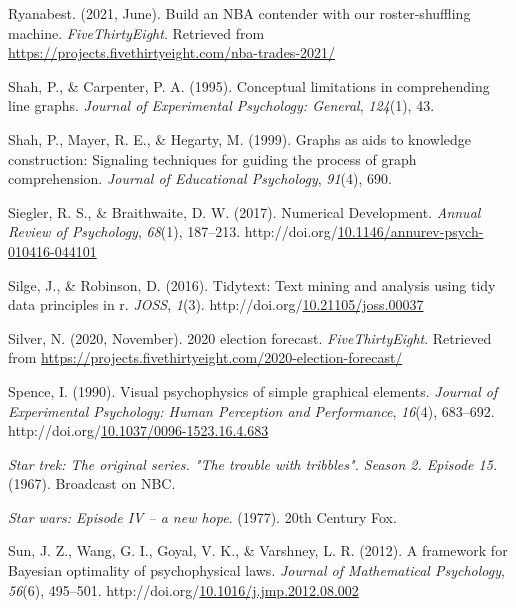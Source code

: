 \documentclass[print]{nuthesis}
\newlength{\cslhangindent}
\newenvironment{CSLReferences}%
{\setlength{\parindent}{0pt}%
\everypar{\setlength{\hangindent}{\cslhangindent}}\ignorespaces}%
{\par}
\begin{document}
\begin{CSLReferences}{1}{0}
\leavevmode{}%
Ryanabest. (2021, June). Build an NBA contender with our roster-shuffling machine. \emph{FiveThirtyEight}. Retrieved from \url{https://projects.fivethirtyeight.com/nba-trades-2021/}

\leavevmode{}%
Shah, P., \& Carpenter, P. A. (1995). Conceptual limitations in comprehending line graphs. \emph{Journal of Experimental Psychology: General}, \emph{124}(1), 43.

\leavevmode{}%
Shah, P., Mayer, R. E., \& Hegarty, M. (1999). Graphs as aids to knowledge construction: Signaling techniques for guiding the process of graph comprehension. \emph{Journal of Educational Psychology}, \emph{91}(4), 690.

\leavevmode{}%
Siegler, R. S., \& Braithwaite, D. W. (2017). Numerical {Development}. \emph{Annual Review of Psychology}, \emph{68}(1), 187--213. http://doi.org/\href{https://doi.org/10.1146/annurev-psych-010416-044101}{10.1146/annurev-psych-010416-044101}

\leavevmode{}%
Silge, J., \& Robinson, D. (2016). Tidytext: Text mining and analysis using tidy data principles in r. \emph{JOSS}, \emph{1}(3). http://doi.org/\href{https://doi.org/10.21105/joss.00037}{10.21105/joss.00037}

\leavevmode{}%
Silver, N. (2020, November). 2020 election forecast. \emph{FiveThirtyEight}. Retrieved from \url{https://projects.fivethirtyeight.com/2020-election-forecast/}

\leavevmode{}%
Spence, I. (1990). Visual psychophysics of simple graphical elements. \emph{Journal of Experimental Psychology: Human Perception and Performance}, \emph{16}(4), 683--692. http://doi.org/\href{https://doi.org/10.1037/0096-1523.16.4.683}{10.1037/0096-1523.16.4.683}

\leavevmode{}%
\emph{Star trek: The original series. "The trouble with tribbles". Season 2. Episode 15.} (1967). Broadcast on NBC.

\leavevmode{}%
\emph{Star wars: Episode IV -- a new hope}. (1977). 20th Century Fox.

\leavevmode{}%
Sun, J. Z., Wang, G. I., Goyal, V. K., \& Varshney, L. R. (2012). A framework for {Bayesian} optimality of psychophysical laws. \emph{Journal of Mathematical Psychology}, \emph{56}(6), 495--501. http://doi.org/\href{https://doi.org/10.1016/j.jmp.2012.08.002}{10.1016/j.jmp.2012.08.002}


\end{CSLReferences}
\end{document}
